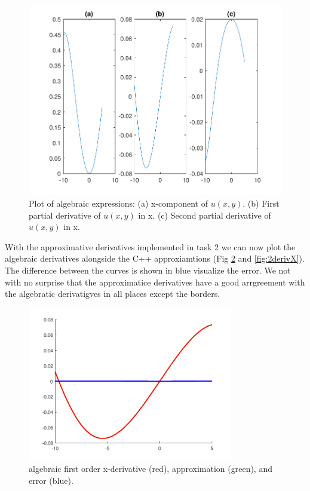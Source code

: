 \documentclass[paper=a4, fontsize=12pt]{article} %
\begin{document}
\begin{figure}[H]
  \centering
  \includegraphics[width=\textwidth]{algebraicDeriv.pdf}
  \caption{\small Plot of algebraic expressions: (a) x-component of $u(x,y)$. (b) First partial derivative of $u(x,y)$ in x. (c) Second partial derivative of $u(x,y)$ in x.\label{fig:algebraic}}
\end{figure}

With the approximative derivatives implemented in task 2 we can now plot the algebraic derivatives alongside the C++ approxiamtions (Fig \ref{fig:1derivX} and \ref{fig:2derivX}). The difference between the curves is shown in blue visualize the error. We not with no surprise that the approximatice derivatives have a good arrgreement with the algebratic derivatigves in all places except the borders.


\begin{figure}[H]
  \centering
  \includegraphics[width=0.8\textwidth]{comparison-x.pdf}
  \caption{\small algebraic first order x-derivative (red), approximation (green), and error (blue).\label{fig:1derivX}}
\end{figure}
\end{document}
